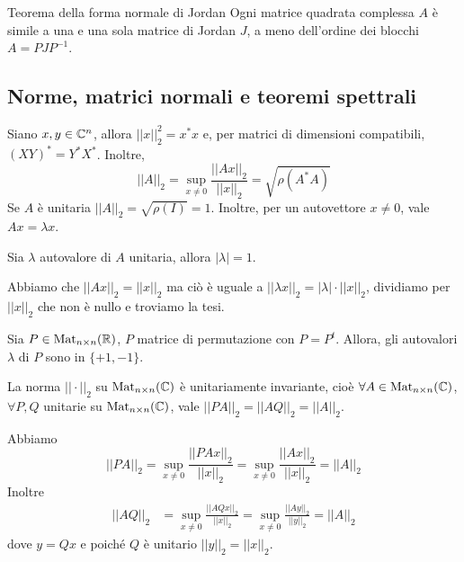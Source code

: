 \documentclass[a4paper]{article}
\begin{document}
\begin{snippettheorem}{Teorema della forma normale di Jordan}
    Ogni matrice quadrata complessa \(A\) è simile a una e una sola matrice di Jordan \(J\), a meno dell'ordine dei blocchi
    \(A = PJP^{-1}\).
\end{snippettheorem}

\subsection{Norme, matrici normali e teoremi spettrali}

Siano \(x,y \in \mathbb{C}^n\), allora \(||x||_2^2 = x^*x\)
e, per matrici di dimensioni compatibili, \((XY)^* = Y^*X^*\).
Inoltre,
\[
    ||A||_2 = \sup_{x \neq 0} \frac{||Ax||_2}{||x||_2} = \sqrt{\rho(A^* A)}
\]
Se \(A\) è unitaria \(||A||_2 = \sqrt{\rho(I)} = 1\). Inoltre, per un autovettore \(x\neq 0\), vale \(Ax = \lambda x\).

\begin{snippettheorem}{}
    Sia \(\lambda\) autovalore di \(A\) unitaria, allora \(|\lambda| = 1\).
\end{snippettheorem}

\begin{snippetproof}{}
    Abbiamo che \(||Ax||_2 = ||x||_2\) ma ciò è uguale a \(||\lambda x||_2 = |\lambda| \cdot ||x||_2\),
    dividiamo per \(||x||_2\) che non è nullo e troviamo la tesi.
\end{snippetproof}

\begin{snippettheorem}{}
    Sia \(P \in \operatorname{Mat}_{n\times n}(\mathbb{R})\), \(P\) matrice di permutazione con \(P=P^t\).
    Allora, gli autovalori \(\lambda\) di \(P\) sono in \(\{+1, -1\}\).
\end{snippettheorem}

\begin{snippettheorem}{}
    La norma \(||\cdot||_2\) su \(\operatorname{Mat}_{n\times n}(\mathbb{C})\) è unitariamente invariante,
    cioè \(\forall A \in \operatorname{Mat}_{n \times n}(\mathbb{C})\), \(\forall P, Q\) unitarie su \(\operatorname{Mat}_{n \times n}(\mathbb{C})\),
    vale \(||PA||_2 = ||AQ||_2 = ||A||_2\).
\end{snippettheorem}

\begin{snippetproof}{}
    Abbiamo
    \[
        ||PA||_2 = \sup_{x \neq 0} \frac{||PAx||_2}{||x||_2} = \sup_{x \neq 0} \frac{||Ax||_2}{||x||_2} = ||A||_2
    \]
    Inoltre
    \begin{align*}
        ||AQ||_2 &= \sup_{x \neq 0} \frac{||AQx||_2}{||x||_2} = \sup_{x \neq 0} \frac{||Ay||_2}{||y||_2} = ||A||_2
    \end{align*}
    dove \(y = Qx\) e poiché \(Q\) è unitario \(||y||_2 = ||x||_2\).
\end{snippetproof}
\end{document}
